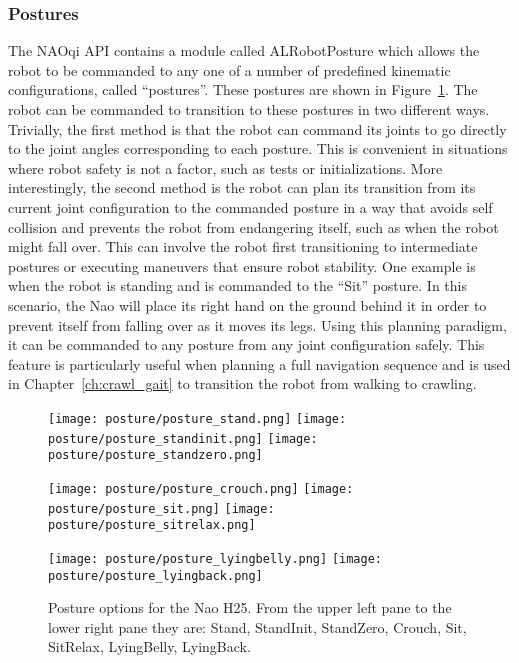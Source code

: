 \subsubsection{Postures}
The NAOqi API contains a module called ALRobotPosture which allows the robot
to be commanded to any one of a number of predefined kinematic configurations,
called ``postures''.
These postures are shown in Figure~\ref{fig:nao_postures1}.
The robot can be commanded to transition to these postures in two different ways.
Trivially, the first method is that the robot can command its joints to go 
directly to the joint angles corresponding to each posture. This is convenient
in situations where robot safety is not a factor, such as tests or initializations.
More interestingly, the second method is the robot can plan its transition
from its current joint configuration to the commanded posture in a way that
avoids self collision and prevents the robot from endangering itself, such
as when the robot might fall over. This can involve the robot first transitioning to intermediate
postures or executing maneuvers that ensure robot stability.
One example is when the robot is standing and is commanded to the ``Sit''
posture. In this scenario, the Nao will place its right hand on the ground
behind it in order to prevent itself from falling over as it moves its legs.
Using this planning paradigm, it can be commanded to any posture from any
joint configuration safely.
This feature is particularly useful when planning a full navigation sequence
and is used in Chapter~\ref{ch:crawl_gait} to transition the robot from 
walking to crawling.
\begin{figure}
\centerline{\texttt{[image: posture/posture\_stand.png]}
            \texttt{[image: posture/posture\_standinit.png]}
            \texttt{[image: posture/posture\_standzero.png]}
}
\vspace*{0.05in}
\centerline{\texttt{[image: posture/posture\_crouch.png]}
            \texttt{[image: posture/posture\_sit.png]}
            \texttt{[image: posture/posture\_sitrelax.png]}
}
\vspace*{0.05in}
\centerline{\texttt{[image: posture/posture\_lyingbelly.png]}
            \texttt{[image: posture/posture\_lyingback.png]}
}
\caption{Posture options for the Nao H25. From the upper left pane to the lower
         right pane they are: Stand, StandInit, StandZero, 
                              Crouch, Sit, SitRelax,
                              LyingBelly, LyingBack.}
\label{fig:nao_postures1}
\end{figure}
